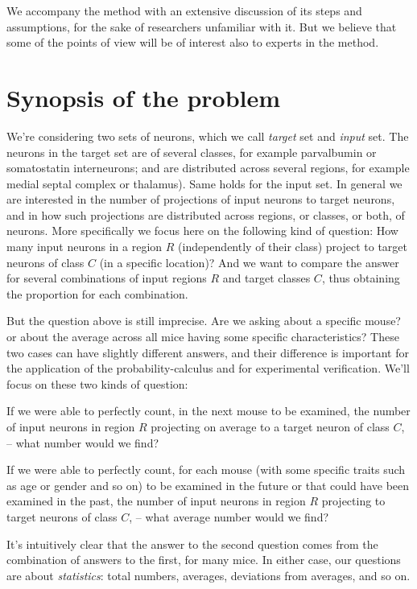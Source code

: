 \documentclass[\ifafour a4paper,12pt,\else a5paper,10pt,\fi%
onecolumn,oneside,article,%
british%
]{memoir}
\theoremstyle{remark}
\theoremstyle{innote}
\renewcommand*{\|}[1][]{\nonscript\,#1\vert\nonscript\;\mathopen{}}
\begin{document}
We accompany the method with an extensive discussion of its steps and
assumptions, for the sake of researchers unfamiliar with it. But we believe
that some of the points of view will be of interest also to experts in the
method.


\section{Synopsis of the problem}
\label{sec:synopsis}

We're considering two sets of neurons, which we call \emph{target} set and
\emph{input} set. The neurons in the target set are of several classes, for
example parvalbumin or somatostatin interneurons; and are distributed
across several regions, for example medial septal complex or thalamus).
Same holds for the input set. In general we are interested in the number of
projections of input neurons to target neurons, and in how such projections
are distributed across regions, or classes, or both, of neurons. More
specifically we focus here on the following kind of question: How many
input neurons in a region $R$ (independently of their class) project to
target neurons of class $C$ (in a specific location)? And we want to
compare the answer for several combinations of input regions $R$ and target
classes $C$, thus obtaining the proportion for each combination.

But the question above is still imprecise. Are we asking about a specific
mouse? or about the average across all mice having some specific
characteristics? These two cases can have slightly different answers, and
their difference is important for the application of the
probability-calculus and for experimental verification. We'll focus on
these two kinds of question:
\begin{description}[font=\itshape\mdseries]
\item[Individual:]\label{item:Qindiv} If we were able to perfectly count,
  in the next mouse to be examined, the number of input neurons in region
  $R$ projecting on average to a target neuron of class $C$, -- what number
  would we find?
\item[Collective or average:]\label{item:Qcollect} If we were able to
  perfectly count, for each mouse (with some specific traits such as age or
  gender and so on) to be examined in the future or that could have been
  examined in the past, the number of input neurons in region $R$
  projecting to target neurons of class $C$, -- what average number would
  we find?
\end{description}
It's intuitively clear that the answer to the second question comes from
the combination of answers to the first, for many mice. In either case, our
questions are about \emph{statistics}: total numbers, averages, deviations
from averages, and so on. 
\end{document}
